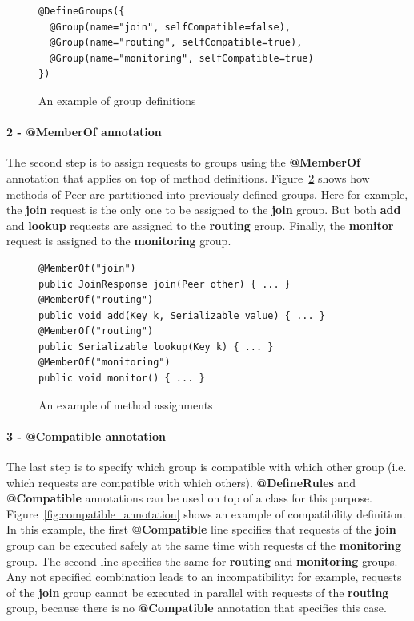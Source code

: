 \documentclass[11pt]{report}
\begin{document}
\begin{figure}[!ht]
	\lstset{language=java, numbers=left, numberstyle=\tiny, stepnumber=1, numbersep=5pt, basicstyle=\footnotesize}
	\begin{lstlisting}[frame=single]
@DefineGroups({
  @Group(name="join", selfCompatible=false),
  @Group(name="routing", selfCompatible=true),
  @Group(name="monitoring", selfCompatible=true)
})
 	\end{lstlisting}
\caption{An example of group definitions}
\label{fig:group_annotation}
\end{figure}

\paragraph{2 - \textbf{@MemberOf} annotation}
The second step is to assign requests to groups using the \textbf{@MemberOf} annotation that applies on top of method definitions. Figure~\ref{fig:memberof_annotation} shows how methods of Peer are partitioned into previously defined groups. Here for example, the \textbf{join} request is the only one to be assigned to the  \textbf{join} group. But both \textbf{add} and \textbf{lookup} requests are assigned to the \textbf{routing} group. Finally, the \textbf{monitor} request is assigned to the \textbf{monitoring} group.

\begin{figure}[!ht]
	\lstset{language=java, numbers=left, numberstyle=\tiny, stepnumber=1, numbersep=5pt, basicstyle=\footnotesize}
	\begin{lstlisting}[frame=single]
@MemberOf("join")
public JoinResponse join(Peer other) { ... }
@MemberOf("routing")
public void add(Key k, Serializable value) { ... }
@MemberOf("routing")
public Serializable lookup(Key k) { ... }
@MemberOf("monitoring")
public void monitor() { ... }
 	\end{lstlisting}
\caption{An example of method assignments}
\label{fig:memberof_annotation}
\end{figure}

\paragraph{3 - \textbf{@Compatible} annotation}
The last step is to specify which group is compatible with which other group (i.e. which requests are compatible with which others). \textbf{@DefineRules} and \textbf{@Compatible} annotations can be used on top of a class for this purpose. Figure~\ref{fig:compatible_annotation} shows an example of compatibility definition. In this example, the first \textbf{@Compatible} line specifies that requests of the \textbf{join} group can be executed safely at the same time with requests of the \textbf{monitoring} group. The second line specifies the same for \textbf{routing} and \textbf{monitoring} groups. Any not specified combination leads to an incompatibility: for example, requests of the \textbf{join} group cannot be executed in parallel with requests of the \textbf{routing} group, because there is no \textbf{@Compatible} annotation that specifies this case.
\end{document}
